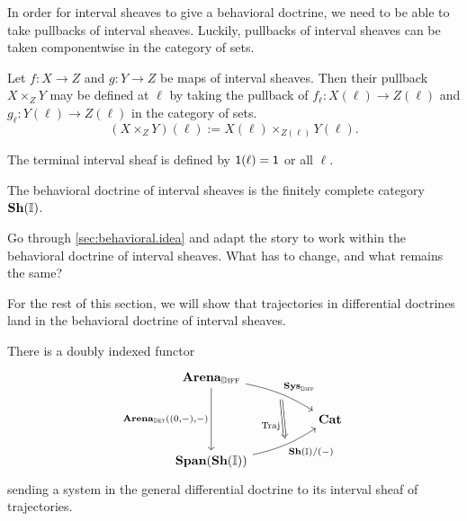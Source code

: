 \documentclass[DynamicalBook]{subfiles}
\begin{document}
In order for interval sheaves to give a behavioral doctrine, we need to be able to take pullbacks of interval sheaves. Luckily, pullbacks of interval sheaves can be taken componentwise in the category of sets.
\begin{proposition}
  Let $f : X \to Z$ and $g : Y \to Z$ be maps of interval sheaves. Then their pullback $X \times_{Z} Y$ may be defined at $\ell$ by taking the pullback of $f_{\ell} : X(\ell) \to Z(\ell)$ and $g_{\ell} : Y(\ell) \to Z(\ell)$ in the category of sets.
  \[
(X \times_{Z} Y)(\ell) := X(\ell) \times_{Z(\ell)} Y(\ell).
  \]

  The terminal interval sheaf is defined by $\mathsf{1}(\ell) = \mathsf{1}$ or all $\ell$.
  \end{proposition}

  \begin{definition}
The behavioral doctrine of interval sheaves is the finitely complete category $\textbf{Sh}(\mathbb{I})$.
    \end{definition}

    \begin{exercise}
Go through \cref{sec:behavioral.idea} and adapt the story to work within the behavioral doctrine of interval sheaves. What has to change, and what remains the same?
      \end{exercise}

For the rest of this section, we will show that trajectories in differential doctrines land in the behavioral doctrine of interval sheaves.
\begin{theorem}
  There is a doubly indexed functor
  \[
\begin{tikzcd}
	{\Cat{Arena}_{\diffdoc}} \\
	&& {\Cat{Cat}} \\
	{\Cat{Span}(\Cat{Sh}(\mathbb{I}))}
	\arrow[""{name=0, anchor=center, inner sep=0}, "{\Cat{Sys}_{\diffdoc}}", from=1-1,
  to=2-3, bend left = 10]
	\arrow[""{name=1, anchor=center, inner sep=0}, "{\Cat{Sh}(\mathbb{I})/(-)}"', from=3-1,
  to=2-3, bend right = 10]
	\arrow["{\Cat{Arena}_{\determ}\left({(0,-)},-\right)}"', from=1-1, to=3-1]
	\arrow["{\Fun{Traj}}"', shorten <=4pt, shorten >=4pt, Rightarrow, from=0, to=1]
\end{tikzcd}
  \]
  sending a system in the general differential doctrine to its interval sheaf of trajectories.
  \end{theorem}
\end{document}
